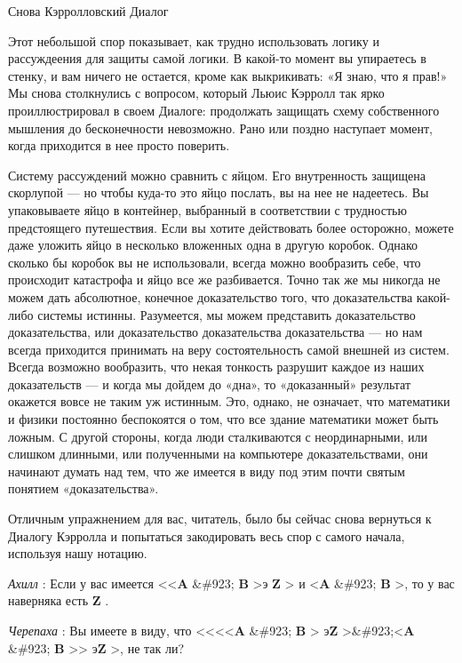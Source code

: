 Снова Кэрролловский Диалог

Этот небольшой спор показывает, как трудно использовать логику и рассуждеения для защиты самой логики. В какой-то момент вы упираетесь в стенку, и вам ничего не остается, кроме как выкрикивать: «Я знаю, что я прав!» Мы снова столкнулись с вопросом, который Льюис Кэрролл так ярко проиллюстрировал в своем Диалоге: продолжать защищать схему собственного мышления до бесконечности невозможно. Рано или поздно наступает момент, когда приходится в нее просто поверить.

Систему рассуждений можно сравнить с яйцом. Его внутренность защищена скорлупой --- но чтобы куда-то это яйцо послать, вы на нее не надеетесь. Вы упаковываете яйцо в контейнер, выбранный в соответствии с трудностью предстоящего путешествия. Если вы хотите действовать более осторожно, можете даже уложить яйцо в несколько вложенных одна в другую коробок. Однако сколько бы коробок вы не использовали, всегда можно вообразить себе, что происходит катастрофа и яйцо все же разбивается. Точно так же мы никогда не можем дать абсолютное, конечное доказательство того, что доказательства какой-либо системы истинны. Разумеется, мы можем представить доказательство доказательства, или доказательство доказательства доказательства --- но нам всегда приходится принимать на веру состоятельность самой внешней из систем. Всегда возможно вообразить, что некая тонкость разрушит каждое из наших доказательств --- и когда мы дойдем до «дна», то «доказанный» результат окажется вовсе не таким уж истинным. Это, однако, не означает, что математики и физики постоянно беспокоятся о том, что все здание математики может быть ложным. С другой стороны, когда люди сталкиваются с неординарными, или слишком длинными, или полученными на компьютере доказательствами, они начинают думать над тем, что же имеется в виду под этим почти святым понятием «доказательства».

Отличным упражнением для вас, читатель, было бы сейчас снова вернуться к Диалогу Кэрролла и попытаться закодировать весь спор с самого начала, используя нашу нотацию.

\emph{Ахилл} : Если у вас имеется \textless\textless{}\textbf{A} \&\#923; \textbf{B} \textgreater э \textbf{Z} \textgreater{} и \textless{}\textbf{A} \&\#923; \textbf{B} \textgreater, то у вас наверняка есть \textbf{Z} .

\emph{Черепаха} : Вы имеете в виду, что \textless\textless\textless\textless{}\textbf{A} \&\#923; \textbf{B} \textgreater{} э\textbf{Z} \textgreater\&\#923;\textless{}\textbf{A} \&\#923; \textbf{B} \textgreater\textgreater{} э\textbf{Z} \textgreater, не так ли?


